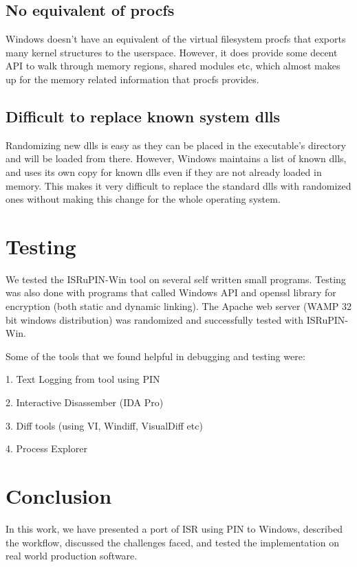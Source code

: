 \documentclass[a4paper,12pt]{llncs}
\begin{document}
\subsection{No equivalent of procfs}
Windows doesn't have an equivalent of the virtual filesystem procfs that exports many kernel structures to the userspace. However, it does provide some decent API to walk through memory regions, shared modules etc, which almost makes up for the memory related information that procfs provides.

\subsection{Difficult to replace known system dlls}
Randomizing new dlls is easy as they can be placed in the executable's directory and will be loaded from there. However, Windows maintains a list of known dlls, and uses its own copy for known dlls even if they are not already loaded in memory. This makes it very difficult to replace the standard dlls with randomized ones without making this change for the whole operating system.

\section{Testing}
\label{sec:testing}
We tested the ISRuPIN-Win tool on several self written small programs. Testing was also done with programs that called Windows API and openssl library for encryption (both static and dynamic linking). The Apache web server (WAMP 32 bit windows distribution) was randomized and successfully tested with ISRuPIN-Win.

Some of the tools that we found helpful in debugging and testing were:

1. Text Logging from tool using PIN

2. Interactive Disassember (IDA Pro)

3. Diff tools (using VI, Windiff, VisualDiff etc)

4. Process Explorer


\section{Conclusion}
\label{sec:conclusion}
In this work, we have presented a port of ISR using PIN to Windows, described the workflow, discussed the challenges faced, and tested the implementation on real world production software.


{}

\end{document}
